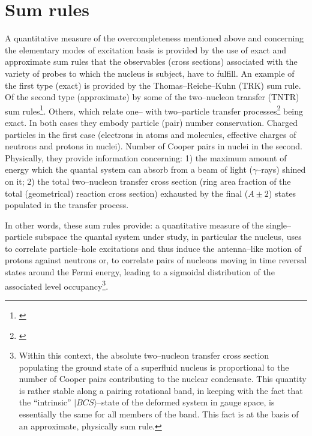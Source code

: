 \section{Sum rules}
A quantitative measure of the overcompleteness mentioned above and concerning the elementary modes of excitation basis is provided by the use of exact and approximate sum rules that the observables (cross sections) associated with the variety of probes to which the nucleus is subject, have to fulfill. An example of the first type (exact) is provided by the Thomas--Reiche--Kuhn (TRK) sum rule. Of the second type (approximate) by some of the two--nucleon transfer (TNTR) sum rules\footnote{\cite{Broglia:72b}}. Others, which relate one-- with two--particle transfer processes\footnote{\cite{Bayman:72,Lanford:77}} being exact. In both cases they embody particle (pair) number conservation. Charged particles in the first case (electrons in atoms and molecules, effective charges of neutrons and protons in nuclei). Number of Cooper pairs in nuclei in the second. Physically, they provide  information concerning: 1) the maximum amount of energy which the quantal system can absorb from a beam of light ($\gamma$--rays) shined on it; 2) the total two--nucleon transfer cross section (ring area fraction of the total (geometrical) reaction cross section) exhausted by the final ($A\pm2$) states populated in the transfer process.


In other words, these sum rules provide: a quantitative measure of the single--particle subspace the quantal system under study, in particular the nucleus, uses to correlate particle--hole excitations and thus induce the antenna--like motion of protons against neutrons or, to correlate pairs of nucleons moving in time reversal states around the Fermi energy, leading to a sigmoidal distribution of the associated level occupancy\footnote{Within this context, the absolute two--nucleon transfer cross section populating the ground state of a superfluid nucleus is proportional to the number of Cooper pairs contributing to the nuclear condensate. This quantity is rather stable along a pairing rotational band, in keeping with the fact that the ``intrinsic'' $|BCS\rangle$--state of the deformed system in gauge space, is essentially the same for all members of the band. This fact is at the basis of an approximate, physically sum rule.}. 


